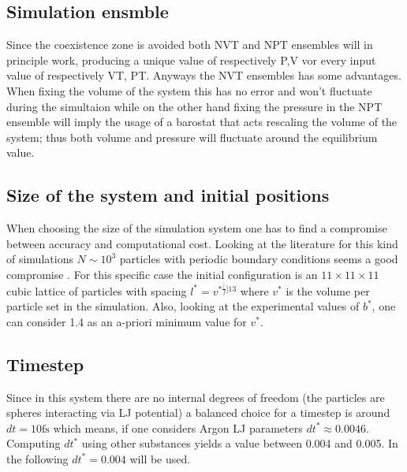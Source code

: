 \documentclass[a4paper, 11pt]{article}
\begin{document}
  \subsection{Simulation ensmble}
    Since the coexistence zone is avoided both NVT and NPT ensembles will in principle work, producing a unique value of respectively P,V vor every input value of respectively VT, PT. Anyways the NVT ensembles has some advantages.
    When fixing the volume of the system this has no error and won't fluctuate during the simultaion while on the other hand fixing the pressure in the NPT ensemble will imply the usage of a barostat that acts rescaling the volume of the system; thus both volume and pressure will fluctuate around the equilibrium value.%

  \subsection{Size of the system and initial positions}
    When choosing the size of the simulation system one has to find a compromise between accuracy and computational cost. Looking at the literature for this kind of simulations $N \sim 10^3$ particles with periodic boundary conditions seems a good compromise \cite{rif:article1}. For this specific case the initial configuration is an $11 \times 11 \times 11$ cubic lattice of particles with spacing $l^* = v^{*\frac[f]{1}{3}}$ where $v^*$ is the volume per particle set in the simulation. Also, looking at the experimental values of $b^*$, one can consider 1.4 as an a-priori minimum value for $v^*$.

  \subsection{Timestep}
    Since in this system there are no internal degrees of freedom (the particles are spheres interacting via LJ potential) a balanced choice for a timestep is around $dt = 10 \si{\femto\second}$ which means, if one considers Argon LJ parameters $dt^* \approx 0.0046$. Computing $dt^*$ using other substances yields a value between 0.004 and 0.005. In the following $dt^* = 0.004$ will be used.
\end{document}
